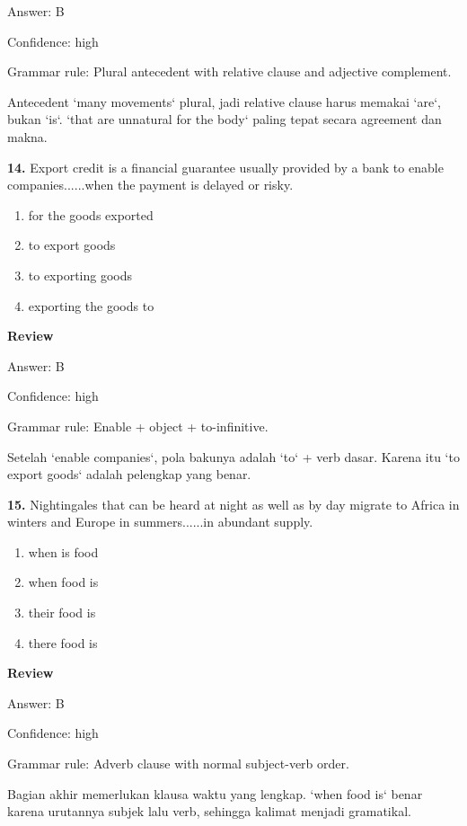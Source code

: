 \documentclass[12pt]{article}
\begin{document}
Answer: B\par
Confidence: high\par
Grammar rule: Plural antecedent with relative clause and adjective complement.\par
Antecedent `many movements` plural, jadi relative clause harus memakai `are`, bukan `is`. `that are unnatural for the body` paling tepat secara agreement dan makna.\par
\endgroup
\par
\vspace{0.25\baselineskip}
\noindent\textbf{14.} Export credit is a financial guarantee usually provided by a bank to enable companies......when the payment is delayed or risky.
\begin{enumerate}[label=(\Alph*),leftmargin=*,itemsep=0.2em]
\item for the goods exported
\item to export goods
\item to exporting goods
\item exporting the goods to
\end{enumerate}
\par
\begingroup
\setlength{\parskip}{0pt}
\setlength{\parindent}{0pt}
\textbf{Review}\par
Answer: B\par
Confidence: high\par
Grammar rule: Enable + object + to-infinitive.\par
Setelah `enable companies`, pola bakunya adalah `to` + verb dasar. Karena itu `to export goods` adalah pelengkap yang benar.\par
\endgroup
\par
\vspace{0.25\baselineskip}
\noindent\textbf{15.} Nightingales that can be heard at night as well as by day migrate to Africa in winters and Europe in summers......in abundant supply.
\begin{enumerate}[label=(\Alph*),leftmargin=*,itemsep=0.2em]
\item when is food
\item when food is
\item their food is
\item there food is
\end{enumerate}
\par
\begingroup
\setlength{\parskip}{0pt}
\setlength{\parindent}{0pt}
\textbf{Review}\par
Answer: B\par
Confidence: high\par
Grammar rule: Adverb clause with normal subject-verb order.\par
Bagian akhir memerlukan klausa waktu yang lengkap. `when food is` benar karena urutannya subjek lalu verb, sehingga kalimat menjadi gramatikal.\par
\endgroup
\par
\vspace{0.25\baselineskip}
\end{document}
